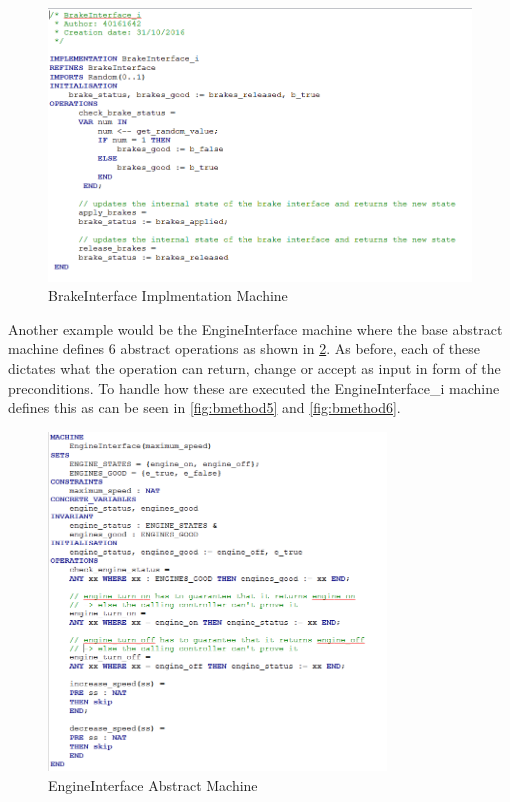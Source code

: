 \documentclass[12pt]{article}
\begin{document}
\begin{figure}[H]
	\centering
	\includegraphics[width=1.0\textwidth]{brake_interface_implementationv2}
	\caption{BrakeInterface Implmentation Machine}
	\label{fig:bmethod3}
\end{figure}

Another example would be the EngineInterface machine where the base abstract machine defines 6 abstract operations as shown in \ref{fig:bmethod4}. As before, each of these dictates what the operation can return, change or accept as input in form of the preconditions. To handle how these are executed the EngineInterface\_i machine defines this as can be seen in \ref{fig:bmethod5} and \ref{fig:bmethod6}.

\begin{figure}[H]
	\centering
	\includegraphics[width=0.8\textwidth]{engine_interface_abstract_v2}
	\caption{EngineInterface Abstract Machine}
	\label{fig:bmethod4}
\end{figure}
\end{document}
